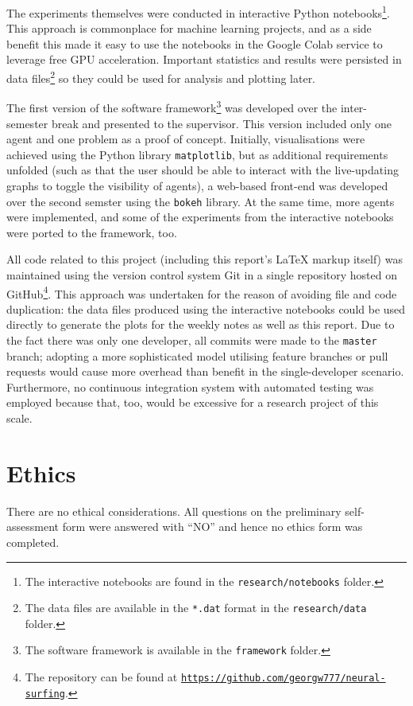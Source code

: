 The experiments themselves were conducted in interactive Python notebooks\footnote{The interactive notebooks are found in the \texttt{research/notebooks} folder.}.
This approach is commonplace for machine learning projects, and as a side benefit this made it easy to use the notebooks in the Google Colab service to leverage free GPU acceleration.
Important statistics and results were persisted in data files\footnote{The data files are available in the \texttt{*.dat} format in the \texttt{research/data} folder.} so they could be used for analysis and plotting later.

The first version of the software framework\footnote{The software framework is available in the \texttt{framework} folder.} was developed over the inter-semester break and presented to the supervisor.
This version included only one agent and one problem as a proof of concept. 
Initially, visualisations were achieved using the Python library \texttt{matplotlib}, but as additional requirements unfolded (such as that the user should be able to interact with the live-updating graphs to toggle the visibility of agents), a web-based front-end was developed over the second semster using the \texttt{bokeh} library.
At the same time, more agents were implemented, and some of the experiments from the interactive notebooks were ported to the framework, too.

All code related to this project (including this report's \LaTeX{} markup itself) was maintained using the version control system Git in a single repository hosted on GitHub\footnote{The repository can be found at \href{https://github.com/georgw777/neural-surfing}{\texttt{https://github.com/georgw777/neural-surfing}}.}.
This approach was undertaken for the reason of avoiding file and code duplication: the data files produced using the interactive notebooks could be used directly to generate the plots for the weekly notes as well as this report.
Due to the fact there was only one developer, all commits were made to the \texttt{master} branch; adopting a more sophisticated model utilising feature branches or pull requests would cause more overhead than benefit in the single-developer scenario.
Furthermore, no continuous integration system with automated testing was employed because that, too, would be excessive for a research project of this scale. 

\section{Ethics}
There are no ethical considerations. 
All questions on the preliminary self-assessment form were answered with ``NO'' and hence no ethics form was completed.


